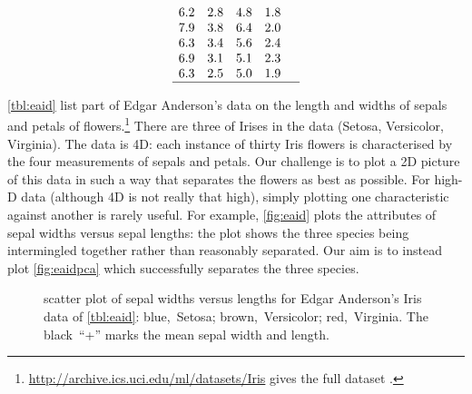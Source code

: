 \begin{example}
\begin{table}
\begin{equation*}
\begin{array}{rrrrl}
\\6.2&2.8&4.8&1.8&
\\7.9&3.8&6.4&2.0&
\\6.3&3.4&5.6&2.4&
\\6.9&3.1&5.1&2.3&
\\6.3&2.5&5.0&1.9&
\\\hline
\end{array}
\end{equation*}
\end{table}
\autoref{tbl:eaid} list part of Edgar Anderson's data on the length and widths of sepals and petals of  flowers.\footnote{\url{http://archive.ics.uci.edu/ml/datasets/Iris} gives the full dataset \cite[]{Lichman2013}.}
There are three  of Irises in the data (Setosa, Versicolor, Virginia).
The data is 4D: each instance of thirty Iris flowers is characterised by the four measurements of sepals and petals.
Our challenge is to plot a 2D picture of this data in such a way that separates the flowers as best as possible.
For high-D data (although 4D is not really that high), simply plotting one characteristic against another is rarely useful.
For example,  \autoref{fig:eaid} plots the attributes of sepal widths versus sepal lengths: the plot shows the three species being intermingled together rather than reasonably separated.
Our aim is to instead plot \autoref{fig:eaidpca} which successfully separates the three species.

\begin{figure}
\centering
{}
\caption{scatter plot of sepal widths versus lengths for Edgar Anderson's Iris data of \autoref{tbl:eaid}: blue,~Setosa; brown,~Versicolor; red,~Virginia.  
The black~``+'' marks the mean sepal width and length.}
\label{fig:eaid}
\end{figure}


\end{example}
